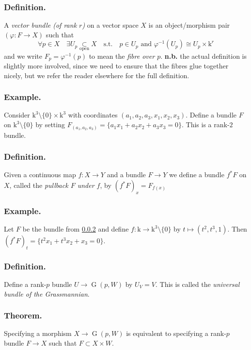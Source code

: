 \documentclass[10pt]{article}
\numberwithin{equation}{subsubsection}
\DeclareMathOperator{\G}{G}
\renewcommand{\k}{\mathrm{k}}
\begin{document}
            \subsubsection{Definition.} A \textit{vector bundle (of rank $r$)} on a vector space $X$ is an object/morphism pair $(\varphi\colon F\to X)$ such that \[\forall p\in X \quad \exists U_p\underset{\text{open}}{\subset}X \quad \text{s.t.} \quad p\in U_p\text{ and }\varphi^{-1}(U_p)\cong U_p\times\k^r\]
                and we write $F_p=\varphi^{-1}(p)$ to mean the \textit{fibre over $p$}.
                \textbf{n.b.} the actual definition is slightly more involved, since we need to ensure that the fibres glue together nicely, but we refer the reader elsewhere for the full definition.
            
            \subsubsection{Example.}\label{bundle-example} Consider $\k^3\setminus\{0\}\times\k^3$ with coordinates $(a_1,a_2,a_3,x_1,x_2,x_3)$. Define a bundle $F$ on $\k^3\setminus\{0\}$ by setting $F_{(a_1,a_2,a_3)}=\{a_1x_1+a_2x_2+a_3x_3=0\}$. This is a rank-$2$ bundle.
            
            \subsubsection{Definition.} Given a continuous map $f\colon X\to Y$ and a bundle $F\to Y$ we define a bundle $f^*F$ on $X$, called the \textit{pullback $F$ under $f$}, by $(f^*F)_x=F_{f(x)}$
            
            \subsubsection{Example.} Let $F$ be the bundle from \ref{bundle-example} and define $f\colon\k\to\k^3\setminus\{0\}$ by $t\mapsto(t^2,t^3,1)$. Then $(f^*F)_t=\{t^2x_1+t^3x_2+x_3=0\}$.
            
            \subsubsection{Definition.} Define a rank-$p$ bundle $U\to\G(p,W)$ by $U_V=V$. This is called the \textit{universal bundle of the Grassmannian}.
            
            \subsubsection{Theorem.} Specifying a morphism $X\to\G(p,W)$ is equivalent to specifying a rank-$p$ bundle $F\to X$ such that $F\subset X\times W$.
            
\end{document}
